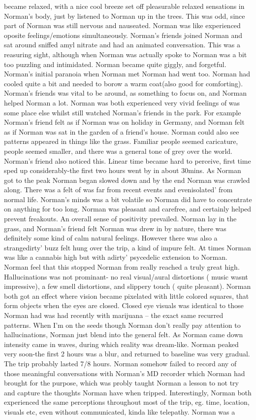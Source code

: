 \documentclass[12pt]{book}
\begin{document}
became relaxed, with a nice cool breeze set off pleasurable relaxed sensations in Norman's body, just by listened to Norman up in the trees. This was odd, since part of Norman was still nervous and nauseated. Norman was like experienced oposite feelings/emotions simultaneously. Norman's friends joined Norman and sat around sniffed amyl nitrate and had an animated conversation. This was a reasuring sight, although when Norman was actually spoke to Norman was a bit too puzzling and intimidated. Norman became quite giggly, and forgetful. Norman's initial paranoia when Norman met Norman had went too. Norman had cooled quite a bit and needed to borow a warm coat(also good for comforting). Norman's friends was vital to be around, as something to focus on, and Norman helped Norman a lot. Norman was both experienced very vivid feelings of was some place else whilst still watched Norman's friends in the park. For example Norman's friend felt as if Norman was on holiday in Germany, and Norman felt as if Norman was sat in the garden of a friend's house. Norman could also see patterns appeared in things like the grass. Familiar people seemed caricature, people seemed smaller, and there was a general tone of grey over the world. Norman's friend also noticed this. Linear time became hard to perceive, first time sped up considerably-the first two hours went by in about 30mins. As Norman got to the peak Norman began slowed down and by the end Norman was crawled along. There was a felt of was far from recent events and evenisolated' from normal life. Norman's minds was a bit volatile so Norman did have to concentrate on anything for too long. Norman was pleasant and carefree, and certainly helped prevent freakouts. An overall sense of positivity prevailed. Norman lay in the grass, and Norman's friend felt Norman was drew in by nature, there was definitely some kind of calm natural feelings. However there was also a strangedirty' buzz felt hung over the trip, a kind of impure felt. At times Norman was like a cannabis high but with adirty' psycedelic extension to Norman. Norman feel that this stopped Norman from really reached a truly great high. Hallucinations was not prominant- no real visual/aural distortions ( music wasnt impressive), a few smell distortions, and slippery touch ( quite pleasant). Norman both got an effect where vision became pixelated with little colored squares, that form objects when the eyes are closed. Closed eye visuals was identical to those Norman had was had recently with marijuana -- the exact same recurred patterns. When I'm on the seeds though Norman don't really pay attention to hallucinations, Norman just blend into the general felt. As Norman came down intensity came in waves, during which reality was dream-like. Norman peaked very soon-the first 2 hours was a blur, and returned to baseline was very gradual. The trip probably lasted 7/8 hours. Norman somehow failed to record any of those meaningful conversations with Norman's MD recorder which Norman had brought for the purpose, which was probly taught Norman a lesson to not try and capture the thoughts Norman have when tripped. Interestingly, Norman both experienced the same perceptions throughout most of the trip, eg. time, location, visuals etc, even without communicated, kinda like telepathy. Norman was a 
\end{document}
